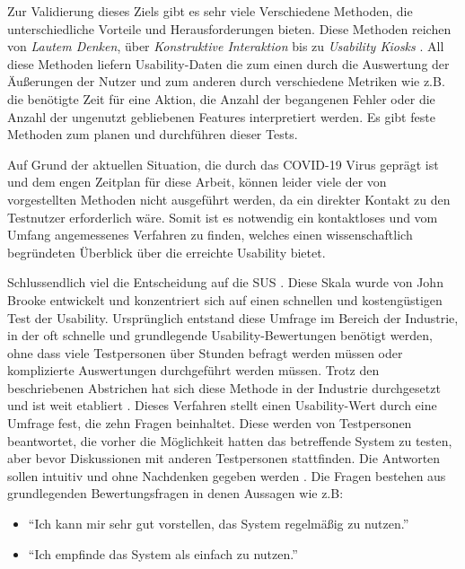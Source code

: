 	\vspace{0.25cm}
	
	Zur Validierung dieses Ziels gibt es sehr viele Verschiedene Methoden, die unterschiedliche Vorteile und Herausforderungen bieten. Diese Methoden reichen von \textit{Lautem Denken}, über \textit{Konstruktive Interaktion} bis zu \textit{Usability Kiosks} \cite{Nielsen.20091993}. All diese Methoden liefern Usability-Daten die zum einen durch die Auswertung der Äußerungen der Nutzer und zum anderen durch verschiedene Metriken wie z.B. die benötigte Zeit für eine Aktion, die Anzahl der begangenen Fehler oder die Anzahl der ungenutzt gebliebenen Features interpretiert werden. Es gibt feste Methoden zum planen und durchführen dieser Tests.
	
	\vspace{0.25cm}
	
	Auf Grund der aktuellen Situation, die durch das COVID-19 Virus geprägt ist und dem engen Zeitplan für diese Arbeit, können leider viele der von \cite{Nielsen.20091993} vorgestellten Methoden nicht ausgeführt werden, da ein direkter Kontakt zu den Testnutzer erforderlich wäre. Somit ist es notwendig ein kontaktloses und vom Umfang angemessenes Verfahren zu finden, welches einen wissenschaftlich begründeten Überblick über die erreichte Usability bietet.
	
	Schlussendlich viel die Entscheidung auf die \ac{SUS} \cite{Brooke.1996}. Diese Skala wurde von John Brooke entwickelt und konzentriert sich auf einen schnellen und kostengüstigen Test der Usability. Ursprünglich entstand diese Umfrage im Bereich der Industrie, in der oft schnelle und grundlegende Usability-Bewertungen benötigt werden, ohne dass viele Testpersonen über Stunden befragt werden müssen oder komplizierte Auswertungen durchgeführt werden müssen. Trotz den beschriebenen Abstrichen hat sich diese Methode in der Industrie durchgesetzt und ist weit etabliert \cite{MatthiasRauer.11.April}. Dieses Verfahren stellt einen Usability-Wert durch eine Umfrage fest, die zehn Fragen beinhaltet. Diese werden von Testpersonen beantwortet, die vorher die Möglichkeit hatten das betreffende System zu testen, aber bevor Diskussionen mit anderen Testpersonen stattfinden. Die Antworten sollen intuitiv und ohne Nachdenken gegeben werden \cite{Brooke.1996}. Die Fragen bestehen aus grundlegenden Bewertungsfragen in denen Aussagen wie z.B:
	
	\begin{itemize}
		\item \enquote{Ich kann mir sehr gut vorstellen, das System regelmäßig zu nutzen.}
		\item \enquote{Ich empfinde das System als einfach zu nutzen.}
	\end{itemize}

